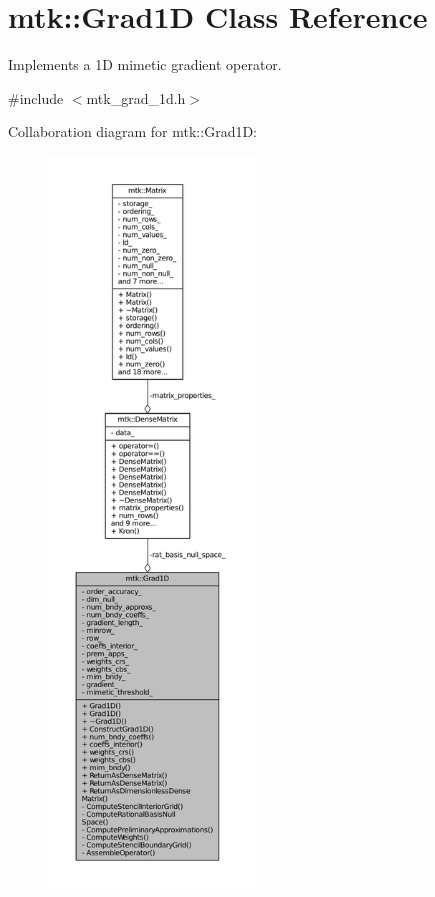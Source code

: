 \hypertarget{classmtk_1_1Grad1D}{\section{mtk\+:\+:Grad1\+D Class Reference}
\label{classmtk_1_1Grad1D}
}


Implements a 1\+D mimetic gradient operator.  




{\ttfamily \#include $<$mtk\+\_\+grad\+\_\+1d.\+h$>$}



Collaboration diagram for mtk\+:\+:Grad1\+D\+:\nopagebreak
\begin{figure}[H]
\begin{center}
\leavevmode
\includegraphics[height=550pt]{classmtk_1_1Grad1D__coll__graph}
\end{center}
\end{figure}
